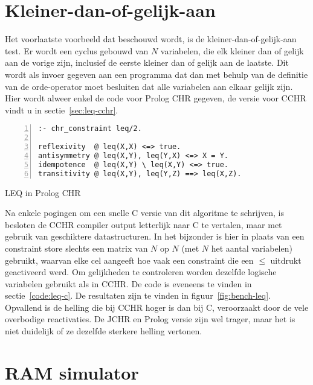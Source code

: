 \section{Kleiner-dan-of-gelijk-aan} \label{sec:bench-leq}

Het voorlaatste voorbeeld dat beschouwd wordt, is de kleiner-dan-of-gelijk-aan test. Er wordt een cyclus gebouwd van $N$ variabelen, die elk kleiner dan of gelijk aan de vorige zijn, inclusief de eerste kleiner dan of gelijk aan de laatste. Dit wordt als invoer gegeven aan een programma dat dan met behulp van de definitie van de orde-operator moet besluiten dat alle variabelen aan elkaar gelijk zijn. Hier wordt alweer enkel de code voor Prolog CHR gegeven, de versie voor CCHR vindt u in sectie~\ref{sec:leq-cchr}.
\begin{exCode}
\begin{Verbatim}[frame=single,numbers=left]
:- chr_constraint leq/2.

reflexivity  @ leq(X,X) <=> true.
antisymmetry @ leq(X,Y), leq(Y,X) <=> X = Y.
idempotence  @ leq(X,Y) \ leq(X,Y) <=> true.
transitivity @ leq(X,Y), leq(Y,Z) ==> leq(X,Z).
\end{Verbatim}
\caption{\label{code:leq} LEQ in Prolog CHR}
\end{exCode}
Na enkele pogingen om een snelle C versie van dit algoritme te schrijven, is besloten de CCHR compiler output letterlijk naar C te vertalen, maar met gebruik van geschiktere datastructuren. In het bijzonder is hier in plaats van een constraint store slechts een matrix van $N$ op $N$ (met $N$ het aantal variabelen) gebruikt, waarvan elke cel aangeeft hoe vaak een constraint die een $\leq$ uitdrukt geactiveerd werd. Om gelijkheden te controleren worden dezelfde logische variabelen gebruikt als in CCHR. De code is eveneens te vinden in sectie~\ref{code:leq-c}.
De resultaten zijn te vinden in figuur~\ref{fig:bench-leq}. Opvallend is de helling die bij CCHR hoger is dan bij C, veroorzaakt door de vele overbodige reactivaties. De JCHR en Prolog versie zijn wel trager, maar het is niet duidelijk of ze dezelfde sterkere helling vertonen.

\section{RAM simulator} \label{sec:bench-ram}

